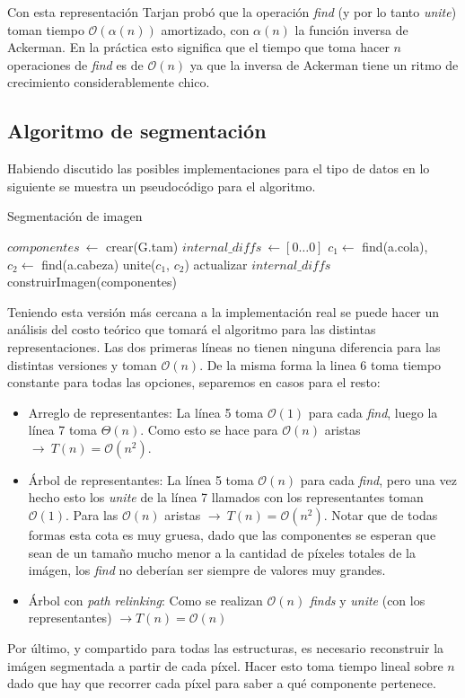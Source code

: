 \vspace{-10mm}
Con esta representaci\'on Tarjan \cite{Tarjan} prob\'o que la operaci\'on \textit{find} (y por lo tanto \textit{unite}) toman tiempo $\mathcal{O}(\alpha(n))$ amortizado, con $\alpha(n)$ la funci\'on inversa de Ackerman. En la práctica esto significa que el tiempo que toma hacer $n$ operaciones de \textit{find} es de $\mathcal{O}(n)$ ya que la inversa de Ackerman tiene un ritmo de crecimiento considerablemente chico.
\vspace{-7mm}

\subsection{Algoritmo de segmentaci\'on}
Habiendo discutido las posibles implementaciones para el tipo de datos en lo siguiente se muestra un pseudoc\'odigo para el algoritmo.

\begin{algorithm}[H]
\caption{Segmentaci\'on de imagen}
\label{segmentation}
\begin{algorithmic}[1]
 
\State $componentes \ \gets$ crear(G.tam)
\State $internal\_diffs \ \gets [0\dots 0]$
	\State $c_1 \gets$ find(a.cola), $c_2 \gets$ find(a.cabeza)
		\State unite($c_1$, $c_2$)
		\State actualizar $internal\_diffs$
	\EndIf
\EndFor
\State construirImagen(componentes) 
\EndProcedure
\end{algorithmic}
\end{algorithm}

Teniendo esta versi\'on m\'as cercana a la implementaci\'on real se puede hacer un an\'alisis del costo te\'orico que tomar\'a el algoritmo para las distintas representaciones. Las dos primeras líneas no tienen ninguna diferencia para las distintas versiones y toman $\mathcal{O}(n)$. De la misma forma la linea 6 toma tiempo constante para todas las opciones, separemos en casos para el resto:
\begin{itemize}
	\item Arreglo de representantes: La línea 5 toma $\mathcal{O}(1)$ para cada \textit{find}, luego la línea 7 toma $\Theta(n)$. Como esto se hace para $\mathcal{O}(n)$ aristas $\rightarrow \ T(n)=\mathcal{O}(n^2)$.
	\item Árbol de representantes: La línea 5 toma $\mathcal{O}(n)$ para cada \textit{find}, pero una vez hecho esto los \textit{unite} de la línea 7 llamados con los representantes toman $\mathcal{O}(1)$. Para las $\mathcal{O}(n)$ aristas $\rightarrow \ T(n)=\mathcal{O}(n^2)$. Notar que de todas formas esta cota es muy gruesa, dado que las componentes se esperan que sean de un tama\~no mucho menor a la cantidad de píxeles totales de la im\'agen, los \textit{find} no deber\'ian ser siempre de valores muy grandes.
	\item Árbol con \textit{path relinking}: Como se realizan $\mathcal{O}(n)$ \textit{finds} y \textit{unite} (con los representantes) $\rightarrow T(n)=\mathcal{O}(n)$
\end{itemize}

\indent Por último, y compartido para todas las estructuras, es necesario reconstruir la im\'agen segmentada a partir de cada píxel. Hacer esto toma tiempo lineal sobre $n$ dado que hay que recorrer cada píxel para saber a qué componente pertenece.